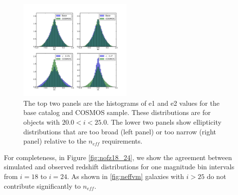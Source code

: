 \documentclass[11pt]{article}
\begin{document}
\begin{figure}[h]
\centering
\includegraphics[width=0.5\textwidth]{validation_figures/e_hist.png}
\caption{The top two panels are the histograms of e1 and e2 values for
  the base catalog and COSMOS sample.  These distributions are for
  objects with $20.0 < i < 25.0$. The lower two panels show
  ellipticity distributions that are too broad (left panel) or too
  narrow (right panel) relative to the $n_{eff}$ requirements.}
\label{fig:e_hist}
\end{figure}

For completeness, in Figure \ref{fig:nofz18_24}, we show the agreement
between simulated and observed \citep{coil04} redshift distributions
for one magnitude bin intervals from $i=18$ to $i=24$.  As shown in
\ref{fig:neffvm} galaxies with $i > 25$ do not contribute significantly to $n_{eff}$.
\end{document}
